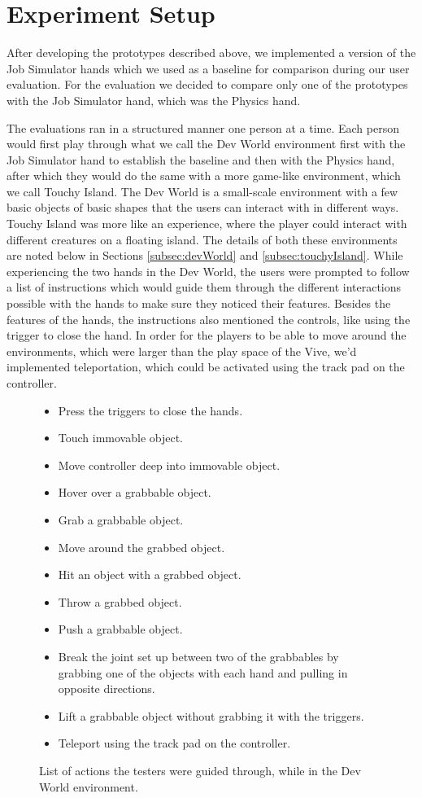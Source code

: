 \section{Experiment Setup}
\label{sec:experimentSetup}
After developing the prototypes described above, we implemented a version of the Job Simulator hands which we used as a baseline for comparison during our user evaluation. For the evaluation we decided to compare only one of the prototypes with the Job Simulator hand, which was the Physics hand.

The evaluations ran in a structured manner one person at a time. Each person would first play through what we call the Dev World environment first with the Job Simulator hand to establish the baseline and then with the Physics hand, after which they would do the same with a more game-like environment, which we call Touchy Island. The Dev World is a small-scale environment with a few basic objects of basic shapes that the users can interact with in different ways. Touchy Island was more like an experience, where the player could interact with different creatures on a floating island. The details of both these environments are noted below in Sections \ref{subsec:devWorld} and \ref{subsec:touchyIsland}. While experiencing the two hands in the Dev World, the users were prompted to follow a list of instructions which would guide them through the different interactions possible with the hands to make sure they noticed their features. Besides the features of the hands, the instructions also mentioned the controls, like using the trigger to close the hand. In order for the players to be able to move around the environments, which were larger than the play space of the Vive, we'd implemented teleportation, which could be activated using the track pad on the controller.

\begin{figure}
\begin{itemize}[noitemsep]
\item Press the triggers to close the hands.
\item Touch immovable object.
\item Move controller deep into immovable object.
\item Hover over a grabbable object.
\item Grab a grabbable object.
\item Move around the grabbed object.
\item Hit an object with a grabbed object.
\item Throw a grabbed object.
\item Push a grabbable object.
\item Break the joint set up between two of the grabbables by grabbing one of the objects with each hand and pulling in opposite directions.
\item Lift a grabbable object without grabbing it with the triggers.
\item Teleport using the track pad on the controller.
\end{itemize}
\caption{List of actions the testers were guided through, while in the Dev World environment.}
\label{fig:listActionsDevWorld}
\end{figure}

